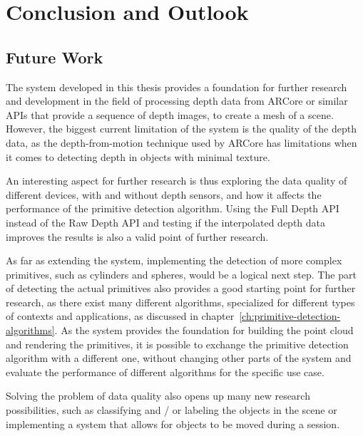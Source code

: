 \chapter{Conclusion and Outlook}

\section{Future Work}

The system developed in this thesis provides a foundation for further research and development in
the field of processing depth data from ARCore or similar APIs that provide a sequence of depth images, to create a mesh of a scene.
However, the biggest current limitation of the system is the quality of the depth data, as the depth-from-motion technique
used by ARCore has limitations when it comes to detecting depth in objects with minimal texture.

An interesting aspect for further research is thus exploring the data quality of different devices,
with and without depth sensors, and how it affects the performance of the primitive detection algorithm.
Using the Full Depth API instead of the Raw Depth API and testing if the interpolated depth data improves the results
is also a valid point of further research.

As far as extending the system, implementing the detection of more complex primitives,
such as cylinders and spheres, would be a logical next step.
The part of detecting the actual primitives also provides a good starting point for further research,
as there exist many different algorithms, specialized for different types of contexts and applications, as discussed in chapter~\ref{ch:primitive-detection-algorithms}.
As the system provides the foundation for building the point cloud and rendering the primitives,
it is possible to exchange the primitive detection algorithm with a different one, without changing other parts of the system
and evaluate the performance of different algorithms for the specific use case.

Solving the problem of data quality also opens up many new research possibilities,
such as classifying and / or labeling the objects in the scene or implementing a system
that allows for objects to be moved during a session.

%
%

